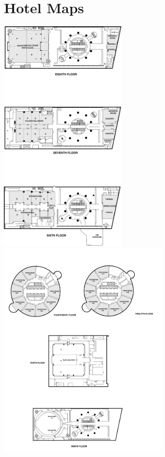 \section*{Hotel Maps}
\setlength{\parindent}{0in}
\setlength{\parskip}{2ex}
\renewcommand{\baselinestretch}{0.87}

\begin{center}
\includegraphics[height=450px]{content/map1.pdf}
\includegraphics[height=420px]{content/map2.pdf}
\end{center}
